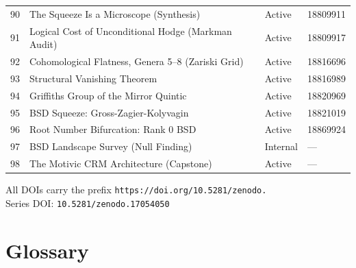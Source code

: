 \documentclass[11pt,twoside,openany]{report}
\theoremstyle{remark}
\begin{document}
\begin{longtable}{@{}r p{7.5cm} l l@{}}
 90 & The Squeeze Is a Microscope (Synthesis) & Active & 18809911 \\
 91 & Logical Cost of Unconditional Hodge (Markman Audit) & Active & 18809917 \\
 92 & Cohomological Flatness, Genera 5--8 (Zariski Grid) & Active & 18816696 \\
 93 & Structural Vanishing Theorem & Active & 18816989 \\
 94 & Griffiths Group of the Mirror Quintic & Active & 18820969 \\
 95 & BSD Squeeze: Gross-Zagier-Kolyvagin & Active & 18821019 \\
 96 & Root Number Bifurcation: Rank 0 BSD & Active & 18869924 \\
 97 & BSD Landscape Survey (Null Finding) & Internal & --- \\
 98 & The Motivic CRM Architecture (Capstone) & Active & --- \\
\bottomrule
\end{longtable}
\endgroup

\noindent All DOIs carry the prefix \texttt{https://doi.org/10.5281/zenodo.}\\
Series DOI: \texttt{10.5281/zenodo.17054050}


\chapter{Glossary}
\end{document}
